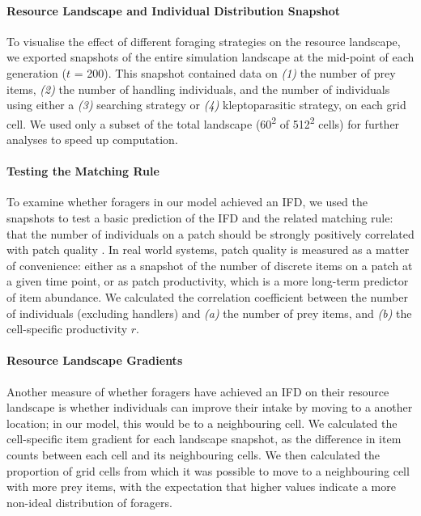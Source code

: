 \documentclass[11pt]{article}
\begin{document}
\paragraph{Resource Landscape and Individual Distribution Snapshot}

To visualise the effect of different foraging strategies on the resource landscape, we exported snapshots of the entire simulation landscape at the mid-point of each generation ($t$ = 200).
This snapshot contained data on \textit{(1)} the number of prey items, \textit{(2)} the number of handling individuals, and the number of individuals using either a \textit{(3)} searching strategy or \textit{(4)} kleptoparasitic strategy, on each grid cell.
We used only a subset of the total landscape (60\textsuperscript{2} of 512\textsuperscript{2} cells) for further analyses to speed up computation.

\paragraph{Testing the Matching Rule}

To examine whether foragers in our model achieved an IFD, we used the snapshots to test a basic prediction of the IFD and the related matching rule: that the number of individuals on a patch should be strongly positively correlated with patch quality \citep{fretwell1970,parker1978}.
In real world systems, patch quality is measured as a matter of convenience: either as a snapshot of the number of discrete items on a patch at a given time point, or as patch productivity, which is a more long-term predictor of item abundance.
We calculated the correlation coefficient between the number of individuals (excluding handlers) and \textit{(a)} the number of prey items, and \textit{(b)} the cell-specific productivity $r$.

\paragraph{Resource Landscape Gradients}

Another measure of whether foragers have achieved an IFD on their resource landscape is whether individuals can improve their intake by moving to a another location; in our model, this would be to a neighbouring cell.
We calculated the cell-specific item gradient for each landscape snapshot, as the difference in item counts between each cell and its neighbouring cells.
We then calculated the proportion of grid cells from which it was possible to move to a neighbouring cell with more prey items, with the expectation that higher values indicate a more non-ideal distribution of foragers.
\end{document}
